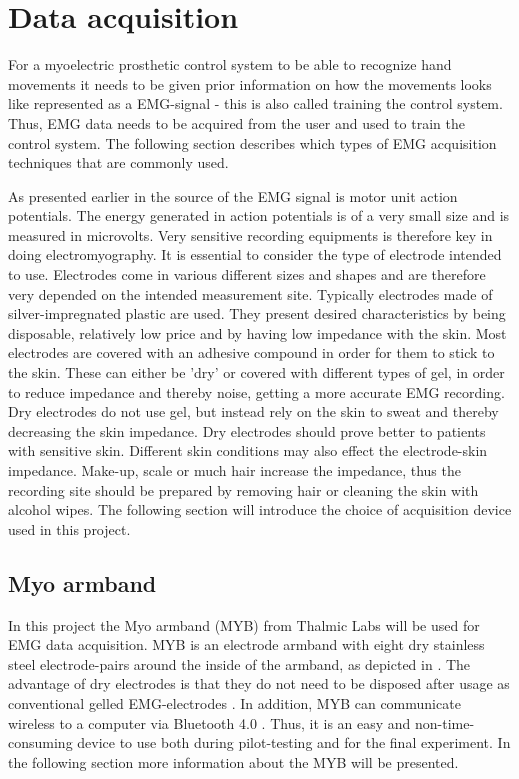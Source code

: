 \section{Data acquisition} \label{sec:dataAq}
For a myoelectric prosthetic control system to be able to recognize hand movements it needs to be given prior information on how the movements looks like represented as a EMG-signal - this is also called training the control system. Thus, EMG data needs to be acquired from the user and used to train the control system. The following section describes which types of EMG acquisition techniques that are commonly used.

As presented earlier in  the source of the EMG signal is motor unit action potentials. The energy generated in action potentials is of a very small size and is measured in microvolts. Very sensitive recording equipments is therefore key in doing electromyography. It is essential to consider the type of electrode intended to use. Electrodes come in various different sizes and shapes and are therefore very depended on the intended measurement site. Typically electrodes made of silver-impregnated plastic are used. They present desired characteristics by being disposable, relatively low price and by having low impedance with the skin. Most electrodes are covered with an adhesive compound in order for them to stick to the skin. These can either be 'dry' or covered with different types of gel, in order to reduce impedance and thereby noise, getting a more accurate EMG recording. Dry electrodes do not use gel, but instead rely on the skin to sweat and thereby decreasing the skin impedance. Dry electrodes should prove better to patients with sensitive skin. Different skin conditions may also effect the electrode-skin impedance. Make-up, scale or much hair increase the impedance, thus the recording site should be prepared by removing hair or cleaning the skin with alcohol wipes. \cite{Cram2012} The following section will introduce the choice of acquisition device used in this project.

\subsection{Myo armband} \label{sub:MYB}
In this project the Myo armband (MYB) from Thalmic Labs will be used for EMG data acquisition. MYB is an electrode armband with eight dry stainless steel electrode-pairs around the inside of the armband, as depicted in . The advantage of dry electrodes is that they do not need to be disposed after usage as conventional gelled EMG-electrodes \cite{Cram2012}. In addition, MYB can communicate wireless to a computer via Bluetooth 4.0 \cite{Myoarmband2013}. Thus, it is an easy and non-time-consuming device to use both during pilot-testing and for the final experiment. In the following section more information about the MYB will be presented.

